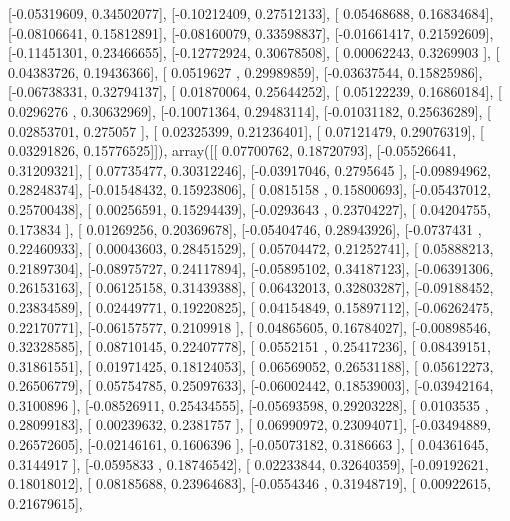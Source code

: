 \documentclass{article}
\begin{document}
       [-0.05319609,  0.34502077],
       [-0.10212409,  0.27512133],
       [ 0.05468688,  0.16834684],
       [-0.08106641,  0.15812891],
       [-0.08160079,  0.33598837],
       [-0.01661417,  0.21592609],
       [-0.11451301,  0.23466655],
       [-0.12772924,  0.30678508],
       [ 0.00062243,  0.3269903 ],
       [ 0.04383726,  0.19436366],
       [ 0.0519627 ,  0.29989859],
       [-0.03637544,  0.15825986],
       [-0.06738331,  0.32794137],
       [ 0.01870064,  0.25644252],
       [ 0.05122239,  0.16860184],
       [ 0.0296276 ,  0.30632969],
       [-0.10071364,  0.29483114],
       [-0.01031182,  0.25636289],
       [ 0.02853701,  0.275057  ],
       [ 0.02325399,  0.21236401],
       [ 0.07121479,  0.29076319],
       [ 0.03291826,  0.15776525]]), array([[ 0.07700762,  0.18720793],
       [-0.05526641,  0.31209321],
       [ 0.07735477,  0.30312246],
       [-0.03917046,  0.2795645 ],
       [-0.09894962,  0.28248374],
       [-0.01548432,  0.15923806],
       [ 0.0815158 ,  0.15800693],
       [-0.05437012,  0.25700438],
       [ 0.00256591,  0.15294439],
       [-0.0293643 ,  0.23704227],
       [ 0.04204755,  0.173834  ],
       [ 0.01269256,  0.20369678],
       [-0.05404746,  0.28943926],
       [-0.0737431 ,  0.22460933],
       [ 0.00043603,  0.28451529],
       [ 0.05704472,  0.21252741],
       [ 0.05888213,  0.21897304],
       [-0.08975727,  0.24117894],
       [-0.05895102,  0.34187123],
       [-0.06391306,  0.26153163],
       [ 0.06125158,  0.31439388],
       [ 0.06432013,  0.32803287],
       [-0.09188452,  0.23834589],
       [ 0.02449771,  0.19220825],
       [ 0.04154849,  0.15897112],
       [-0.06262475,  0.22170771],
       [-0.06157577,  0.2109918 ],
       [ 0.04865605,  0.16784027],
       [-0.00898546,  0.32328585],
       [ 0.08710145,  0.22407778],
       [ 0.0552151 ,  0.25417236],
       [ 0.08439151,  0.31861551],
       [ 0.01971425,  0.18124053],
       [ 0.06569052,  0.26531188],
       [ 0.05612273,  0.26506779],
       [ 0.05754785,  0.25097633],
       [-0.06002442,  0.18539003],
       [-0.03942164,  0.3100896 ],
       [-0.08526911,  0.25434555],
       [-0.05693598,  0.29203228],
       [ 0.0103535 ,  0.28099183],
       [ 0.00239632,  0.2381757 ],
       [ 0.06990972,  0.23094071],
       [-0.03494889,  0.26572605],
       [-0.02146161,  0.1606396 ],
       [-0.05073182,  0.3186663 ],
       [ 0.04361645,  0.3144917 ],
       [-0.0595833 ,  0.18746542],
       [ 0.02233844,  0.32640359],
       [-0.09192621,  0.18018012],
       [ 0.08185688,  0.23964683],
       [-0.0554346 ,  0.31948719],
       [ 0.00922615,  0.21679615],
\end{document}
